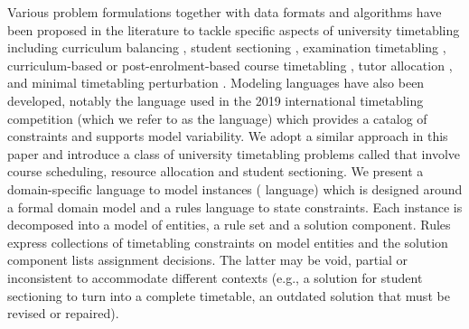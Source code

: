 Various problem formulations together with data formats and algorithms 
have been proposed in the literature to tackle specific aspects of university timetabling including 
curriculum balancing %
\cite{2001_castro_ARXIV,2012_chiarandini_JH,2013_rubio_MPE}, 
student sectioning \cite{2010_muller_AOR,2019_schindl_AOR}, 
examination timetabling \cite{1996_carter_JORS,2020_battistutta_CPAIOR,2010_mccollum_INFORMS},
curriculum-based %
or post-enrolment-based course timetabling \cite{2010_mccollum_INFORMS,2015_bettinelli_TOP,2007_lewis_ITC,2012_cambazard_AOR,2017_goh_EJOR,2021_chen_IEEEA},
tutor allocation \cite{2022_caselli_ESWA},
and minimal timetabling perturbation \cite{2019_lindahl_EJOR,2020_lemos_JS}.
Modeling languages have also been developed, notably the {\XML} language used in the 2019 international timetabling competition \cite{2018_muller_PATAT,2019_ITC} (which we refer to as the {\ITC} language)
which provides a catalog of constraints and supports model variability.
We adopt a similar approach in this paper and introduce a class of university timetabling problems called \UTP{} that involve course scheduling, resource allocation and student sectioning.
We present a domain-specific language to model \UTP{} instances (\UTP{} language) which %
is designed around a formal domain model and a rules language to state constraints. Each instance is decomposed into a model of entities, a rule set and a solution component. Rules express collections of timetabling constraints on model entities and the solution component lists assignment decisions. The latter may be void, partial or inconsistent to accommodate different contexts (e.g., a solution for student sectioning to turn into a complete timetable, an outdated solution that must be revised or repaired). 

